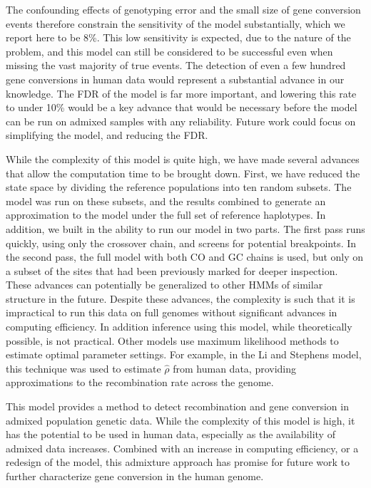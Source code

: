 The confounding effects of genotyping error and the small size of gene conversion events therefore constrain the sensitivity of the model substantially, which we report here to be 8\%.
This low sensitivity is expected, due to the nature of the problem, and this model can still be considered to be successful even when missing the vast majority of true events.
The detection of even a few hundred gene conversions in human data would represent a substantial advance in our knowledge.
The FDR of the model is far more important, and lowering this rate to under 10\% would be a key advance that would be necessary before the model can be run on admixed samples with any reliability.
Future work could focus on simplifying the model, and reducing the FDR.


While the complexity of this model is quite high, we have made several advances that allow the computation time to be brought down.
First, we have reduced the state space by dividing the reference populations into ten random subsets.
The model was run on these subsets, and the results combined to generate an approximation to the model under the full set of reference haplotypes.
In addition, we built in the ability to run our model in two parts.
The first pass runs quickly, using only the crossover chain, and screens for potential breakpoints.
In the second pass, the full model with both CO and GC chains is used, but only on a subset of the sites that had been previously marked for deeper inspection.
These advances can potentially be generalized to other HMMs of similar structure in the future.
Despite these advances, the complexity is such that it is impractical to run this data on full genomes without significant advances in computing efficiency.
In addition inference using this model, while theoretically possible, is not practical.
Other models use maximum likelihood methods to estimate optimal parameter settings.
For example, in the Li and Stephens model, this technique was used to estimate $\hat{\rho}$ from human data, providing approximations to the recombination rate across the genome.

This model provides a method to detect recombination and gene conversion in admixed population genetic data.
While the complexity of this model is high, it has the potential to be used in human data, especially as the availability of admixed data increases.
Combined with an increase in computing efficiency, or a redesign of the model, this admixture approach has promise for future work to further characterize gene conversion in the human genome.




\clearpage
\renewcommand{\bibname}{References}

\begingroup
    \setlength{\bibsep}{10pt}
    \linespread{1}\selectfont
    
\endgroup

